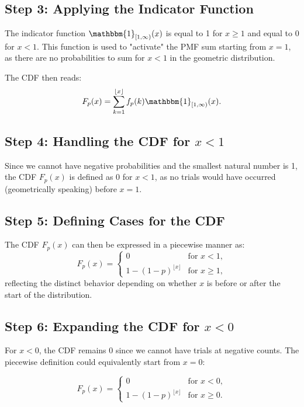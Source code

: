 \documentclass[12pt]{article}
\begin{document}
\subsection*{Step 3: Applying the Indicator Function}

The indicator function \( \mathbbm{1}_{[1, \infty)}(x) \) is equal to 1 for \( x \geq 1 \) and equal to 0 for \( x < 1 \). This function is used to "activate" the PMF sum starting from \( x = 1 \), as there are no probabilities to sum for \( x < 1 \) in the geometric distribution.

The CDF then reads:
\[
F_p(x)=\sum_{k=1}^{\lfloor x \rfloor} f_p(k) \mathbbm{1}_{[1, \infty)}(x).
\]

\subsection*{Step 4: Handling the CDF for \( x < 1 \)}

Since we cannot have negative probabilities and the smallest natural number is 1, the CDF \( F_{p}(x) \) is defined as 0 for \( x < 1 \), as no trials would have occurred (geometrically speaking) before \( x = 1 \).

\subsection*{Step 5: Defining Cases for the CDF}

The CDF \( F_{p}(x) \) can then be expressed in a piecewise manner as:
\[
F_p(x) = 
\begin{cases}
0 & \text{for } x < 1, \\
1 - (1 - p)^{\lfloor x \rfloor} & \text{for } x \geq 1,
\end{cases}
\]
reflecting the distinct behavior depending on whether \( x \) is before or after the start of the distribution.

\subsection*{Step 6: Expanding the CDF for \( x<0 \)}

For \( x < 0 \), the CDF remains 0 since we cannot have trials at negative counts. The piecewise definition could equivalently start from \( x = 0 \):

\[
F_p(x) = 
\begin{cases}
0 & \text{for } x < 0, \\
1 - (1 - p)^{\lfloor x \rfloor} & \text{for } x \geq 0.
\end{cases}
\]
\end{document}
